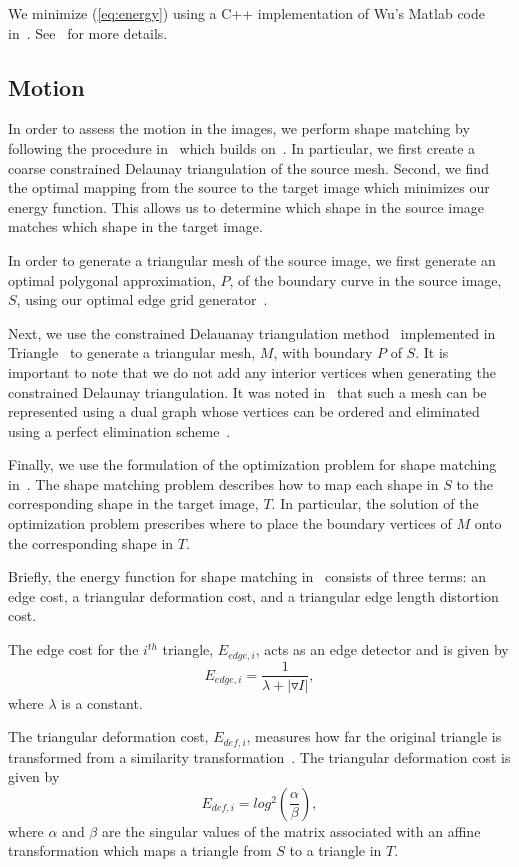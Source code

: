 We minimize (\ref{eq:energy}) using a C++ implementation of Wu's 
Matlab code in~\cite{wu2011}.  See~\cite{chan_vese} for more details.

\subsection{Motion}
In order to assess the motion in the images, we perform shape matching by 
following the procedure in~\cite{jibum_kim_isvc_2010} which builds 
on~\cite{felsenzwalb}.  In particular, we first create a coarse 
constrained Delaunay triangulation of the source mesh.  Second, 
we find the optimal mapping from the source to the target image which 
minimizes our energy function.  This allows us to determine which shape 
in the source image matches which shape in the target image.

In order to generate a triangular mesh of the source image, we first 
generate an optimal polygonal approximation, $P$, of the boundary curve in 
the source image, $S$, using our optimal edge grid generator~\cite{optimal_edge_grids}.

Next, we use the constrained Delauanay triangulation method~\cite{cdt_1} 
implemented in Triangle~\cite{triangle_1} to generate a triangular mesh, 
$M$, with boundary $P$ of $S$.  It is important to note that we do not add 
any interior vertices when generating the constrained Delaunay 
triangulation.  It was noted in~\cite{felsenzwalb} that such a mesh can be 
represented using a dual graph whose vertices can be ordered and 
eliminated using a perfect elimination scheme~\cite{perfect_1}.  

Finally, we use the formulation of the optimization problem for shape 
matching in~\cite{jibum_kim_isvc_2010}.  The shape matching problem 
describes how to map each shape in $S$ to the corresponding shape in the 
target image, $T$.  In particular, the solution of the optimization 
problem prescribes where to place the boundary vertices of $M$ onto the 
corresponding shape in $T$.

Briefly, the energy function for shape matching 
in~\cite{jibum_kim_isvc_2010} consists of three terms:  an edge cost, a 
triangular deformation cost, and a triangular edge length distortion cost.

The edge cost for the $i^{th}$ triangle, $E_{edge,i}$, acts as an edge 
detector and  is given by 
$$
E_{edge,i}=\frac{1}{\lambda +\left |  \triangledown I \right |},
$$
where $\lambda$ is a constant.

The triangular deformation cost, $E_{def,i}$, measures how far the 
original triangle is transformed from a similarity 
transformation~\cite{widrow_1}.  The triangular deformation cost
is given by
$$
E_{def,i}=log^{2}\left ( \frac{\alpha }{\beta } \right ),
$$
where $\alpha$ and $\beta$ are the singular values of the matrix 
associated with an affine transformation which maps a triangle from $S$ to 
a triangle in $T$.  

